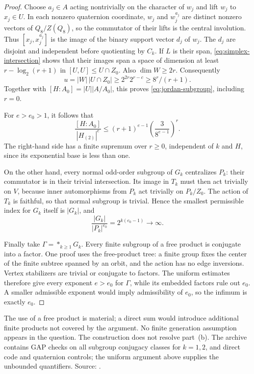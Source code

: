 \begin{proof}
Choose \(a_j\in A\) acting nontrivially on the character of \(w_j\)
and lift \(w_j\) to \(x_j\in U\). In each nonzero quaternion
coordinate, \(w_j\) and \(w_j^{a_j}\) are distinct nonzero vectors
of \(Q_8/Z(Q_8)\), so the commutator of their lifts is the central
involution. Thus \([x_j,x_j^{a_j}]\) is the image of the binary
support vector \(d_j\) of \(w_j\). The \(d_j\) are disjoint and
independent before quotienting by \(C_k\). If \(L\) is their
span, \eqref{eq:simplex-intersection} shows that their images span
a space of dimension at least \(r-\log_2(r+1)\) in
\([U,U]\leq U\cap Z_0\). Also \(\dim W\geq2r\).
Consequently
\[
 u=|W|\,|U\cap Z_0|
   \geq2^{2r}2^{r-c}
   \geq 8^r/(r+1).
\]
Together with \([H:A_0]=|U||A/A_0|\), this proves
\eqref{eq:jordan-subgroup}, including \(r=0\).

For \(e>e_0>1\), it follows that
\[
 \frac{[H:A_0]}{|H_{(2)}|^e}
 \leq (r+1)^{e-1}
       \left(\frac{3}{8^{e-1}}\right)^r.
\]
The right-hand side has a finite supremum over \(r\geq0\),
independent of \(k\) and \(H\), since its exponential base is
less than one.

On the other hand, every normal odd-order subgroup of \(G_k\)
centralizes \(P_k\): their commutator is in their trivial
intersection. Its image in \(T_k\) must then act trivially on
\(V\), because inner automorphisms from \(P_k\) act trivially
on \(P_k/Z_0\). The action of \(T_k\) is faithful, so that
normal subgroup is trivial. Hence the smallest permissible
index for \(G_k\) itself is \(|G_k|\), and
\[
 \frac{|G_k|}{|P_k|^{e_0}}=2^{k(e_0-1)}\longrightarrow\infty.
\]

Finally take \(\Gamma=*_{k\geq1}G_k\). Every finite subgroup
of a free product is conjugate into a factor. One proof uses
the free-product tree: a finite group fixes the center of the
finite subtree spanned by an orbit, and the action has no edge
inversions. Vertex stabilizers are trivial or conjugate to
factors. The uniform estimates therefore give every exponent
\(e>e_0\) for \(\Gamma\), while its embedded factors rule out
\(e_0\). A smaller admissible exponent would imply admissibility
of \(e_0\), so the infimum is exactly \(e_0\).
\end{proof}

The use of a free product is material; a direct sum would introduce
additional finite products not covered by the argument. No finite
generation assumption appears in the question. The construction
does not resolve part~(b). The archive contains GAP checks on all
subgroup conjugacy classes for \(k=1,2\), and direct code and
quaternion controls; the uniform argument above supplies the
unbounded quantifiers. Source: .
